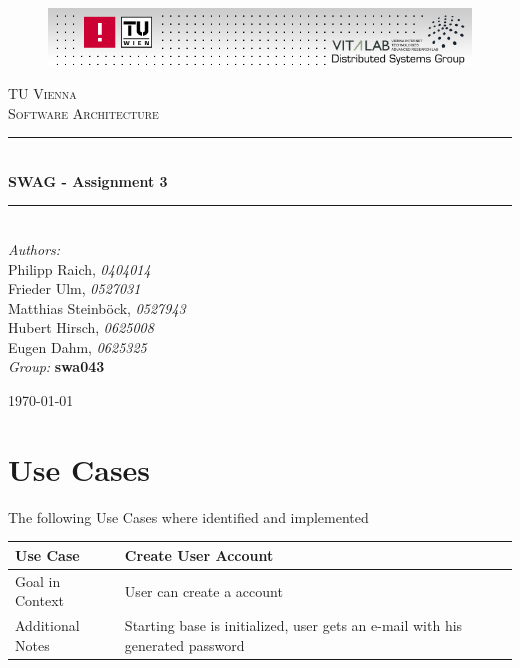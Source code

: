 \documentclass[a4paper]{article}
\newcommand{\TITLE}{SWAG - Assignment 3}
\newcommand{\AUTHOR}{
  Philipp Raich, \emph{0404014}\\
  Frieder Ulm, \emph{0527031}\\
	Matthias Steinböck, \emph{0527943}\\
	Hubert Hirsch, \emph{0625008}\\
	Eugen Dahm, \emph{0625325} 
}
\newcommand{\GROUP}{swa043}
\newcommand{\HRule}{\rule{\linewidth}{0.25mm}}
\begin{document}
\begin{titlepage}

\begin{center}

\begin{figure}[ht!]
  \begin{center}
  \includegraphics[width=1\textwidth]{fig/vitalab-header.png}
  \label{fig:component_diagram}
  \end{center}
\end{figure}

\textsc{\LARGE TU Vienna}\\[1.5cm]

\textsc{\Large Software Architecture}\\[0.5cm]


\HRule \\[0.4cm]
{ \huge \bfseries \TITLE}\\[0.15cm]

\HRule \\[1.5cm]

\emph{Authors:}\\
\large{\AUTHOR\\}
\vfill
\normalsize\emph{Group:}
\large\textbf{\GROUP}\\

\vfill

{\normalsize \today}

\end{center}

\end{titlepage}

\section{Use Cases}

The following Use Cases where identified and implemented

\begin{tabular}[t]{|l|l|p{7cm}|}
\hline
\textbf{Use Case}	&	\multicolumn{2}{|l|}{\textbf{Create User Account}}\\
\hline
Goal in Context	&	\multicolumn{2}{|l|}{User can create a account}\\
\hline
Additional Notes	&	\multicolumn{2}{|p{10cm}|}{Starting base is initialized, user gets an e-mail with his generated password}\\
\hline
\end{tabular}\\
\end{document}
